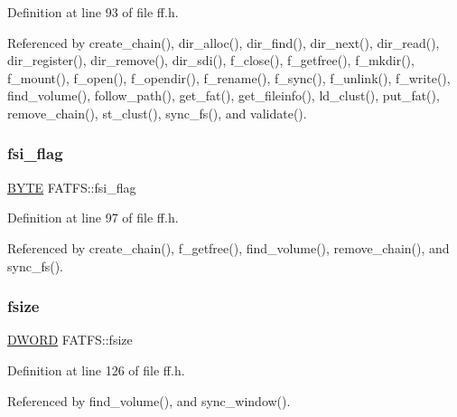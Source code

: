Definition at line 93 of file ff.\+h.



Referenced by create\+\_\+chain(), dir\+\_\+alloc(), dir\+\_\+find(), dir\+\_\+next(), dir\+\_\+read(), dir\+\_\+register(), dir\+\_\+remove(), dir\+\_\+sdi(), f\+\_\+close(), f\+\_\+getfree(), f\+\_\+mkdir(), f\+\_\+mount(), f\+\_\+open(), f\+\_\+opendir(), f\+\_\+rename(), f\+\_\+sync(), f\+\_\+unlink(), f\+\_\+write(), find\+\_\+volume(), follow\+\_\+path(), get\+\_\+fat(), get\+\_\+fileinfo(), ld\+\_\+clust(), put\+\_\+fat(), remove\+\_\+chain(), st\+\_\+clust(), sync\+\_\+fs(), and validate().

\mbox{\label{structFATFS_a84e9cdc5a6a8e33ea7ec192058abf161}} 
\subsubsection{\texorpdfstring{fsi\+\_\+flag}{fsi\_flag}}
{\footnotesize\ttfamily \hyperlink{lz4_8c_a4ae1dab0fb4b072a66584546209e7d58}{B\+Y\+TE} F\+A\+T\+F\+S\+::fsi\+\_\+flag}



Definition at line 97 of file ff.\+h.



Referenced by create\+\_\+chain(), f\+\_\+getfree(), find\+\_\+volume(), remove\+\_\+chain(), and sync\+\_\+fs().

\mbox{\label{structFATFS_a53e9560659f14e66f306c2c444198bf3}} 
\subsubsection{\texorpdfstring{fsize}{fsize}}
{\footnotesize\ttfamily \hyperlink{integer_8h_ad342ac907eb044443153a22f964bf0af}{D\+W\+O\+RD} F\+A\+T\+F\+S\+::fsize}



Definition at line 126 of file ff.\+h.



Referenced by find\+\_\+volume(), and sync\+\_\+window().

\mbox{\label{structFATFS_a417095d7c20d56d417dc0998e0dd5a5c}} 
